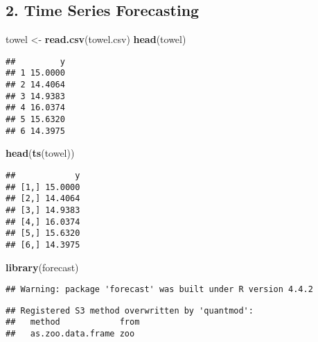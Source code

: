 \documentclass[
]{article}
\newenvironment{Shaded}{\begin{snugshade}}{\end{snugshade}}
\newcommand{\FunctionTok}[1]{\textcolor[rgb]{0.13,0.29,0.53}{\textbf{#1}}}
\newcommand{\NormalTok}[1]{#1}
\newcommand{\OtherTok}[1]{\textcolor[rgb]{0.56,0.35,0.01}{#1}}
\newcommand{\StringTok}[1]{\textcolor[rgb]{0.31,0.60,0.02}{#1}}
\begin{document}
\subsection{2. Time Series Forecasting}\label{time-series-forecasting}

\begin{Shaded}
\begin{Highlighting}[]
\NormalTok{towel }\OtherTok{\textless{}{-}} \FunctionTok{read.csv}\NormalTok{(}\StringTok{\textquotesingle{}towel.csv\textquotesingle{}}\NormalTok{)}
\FunctionTok{head}\NormalTok{(towel)}
\end{Highlighting}
\end{Shaded}

\begin{verbatim}
##         y
## 1 15.0000
## 2 14.4064
## 3 14.9383
## 4 16.0374
## 5 15.6320
## 6 14.3975
\end{verbatim}

\begin{Shaded}
\begin{Highlighting}[]
\FunctionTok{head}\NormalTok{(}\FunctionTok{ts}\NormalTok{(towel))}
\end{Highlighting}
\end{Shaded}

\begin{verbatim}
##            y
## [1,] 15.0000
## [2,] 14.4064
## [3,] 14.9383
## [4,] 16.0374
## [5,] 15.6320
## [6,] 14.3975
\end{verbatim}

\begin{Shaded}
\begin{Highlighting}[]
\FunctionTok{library}\NormalTok{(forecast)}
\end{Highlighting}
\end{Shaded}

\begin{verbatim}
## Warning: package 'forecast' was built under R version 4.4.2
\end{verbatim}

\begin{verbatim}
## Registered S3 method overwritten by 'quantmod':
##   method            from
##   as.zoo.data.frame zoo
\end{verbatim}
\end{document}
